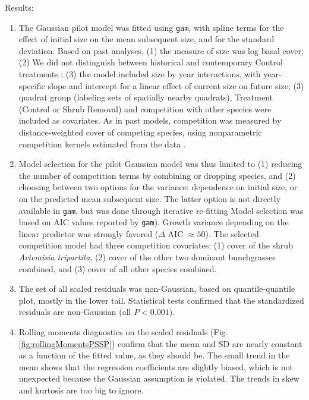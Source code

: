 \documentclass[12pt]{article}
\begin{document}
Results: \begin{enumerate}

\item The Gaussian pilot model was fitted using \texttt{gam}, with spline terms for the effect of initial size on the
mean subsequent size, and for the standard deviation. Based on past analyses, (1) the measure of size was log basal cover; 
(2) We did not distinguish between historical and contemporary Control treatments \citep{Adler-2018}; (3) the model 
included size by year interactions, with year-specific slope and intercept for a linear effect of current size on
future size; (3) quadrat group (labeling sets of spatially nearby quadrats), Treatment (Control or Shrub Removal) and 
competition with other species were included as covariates. As in past models, competition was measured by distance-weighted 
cover of competing species, using nonparametric competition kernels estimated from the data \citep{Teller-2016}. 

\item Model selection for the pilot Gaussian model was thus limited to (1) reducing the number of competition
terms by combining or dropping species, and (2) choosing between two options for the variance: dependence on 
initial size, or on the predicted mean subsequent size. The latter option is not directly available in \texttt{gam}, but was done
through iterative re-fitting Model selection was based on AIC values reported by \texttt{gam}). Growth variance depending on
the linear predictor was strongly favored ($\Delta$ AIC $\approx 50$). The selected competition model had  
three competition covariates: (1) cover of the shrub \emph{Artemisia tripartita}, (2) cover of the other two dominant 
bunchgrasses combined, and (3) cover of all other species combined. 

\item The set of all scaled residuals was non-Gaussian, based on quantile-quantile plot, mostly in the lower tail. Statistical tests
confirmed that the standardized residuals are non-Gaussian (all $P<0.001$). 

\item Rolling moments diagnostics on the scaled residuals (Fig. \ref{fig:rollingMomentsPSSP}) confirm that the mean 
and SD are nearly constant as a function of the fitted value, as they should be. The small trend in the mean shows that the 
regression coefficients are slightly biased, which is not unexpected because the Gaussian assumption is violated. 
The trends in skew and kurtosis are too big to ignore.  


\end{enumerate}
\end{document}
